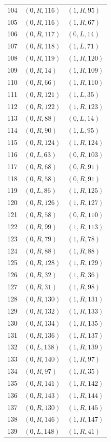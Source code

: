 \begin{longtable}{@{}rll@{}}
104 & $(0,R,116)$ & $(1,R,95)$\\
105 & $(0,R,116)$ & $(1,R,67)$\\
106 & $(0,R,117)$ & $(0,L,14)$\\
107 & $(0,R,118)$ & $(1,L,71)$\\
108 & $(0,R,119)$ & $(1,R,120)$\\
109 & $(0,R,14)$ & $(1,R,109)$\\
110 & $(0,R,66)$ & $(1,R,110)$\\
111 & $(0,R,121)$ & $(1,L,35)$\\
112 & $(0,R,122)$ & $(1,R,123)$\\
113 & $(0,R,88)$ & $(0,L,14)$\\
114 & $(0,R,90)$ & $(1,L,95)$\\
115 & $(0,R,124)$ & $(1,R,124)$\\
116 & $(0,L,63)$ & $(0,R,103)$\\
117 & $(0,R,68)$ & $(0,R,91)$\\
118 & $(0,R,58)$ & $(0,R,91)$\\
119 & $(0,L,86)$ & $(1,R,125)$\\
120 & $(0,R,126)$ & $(1,R,127)$\\
121 & $(0,R,58)$ & $(0,R,110)$\\
122 & $(0,R,99)$ & $(1,R,113)$\\
123 & $(0,R,79)$ & $(1,R,78)$\\
124 & $(0,R,88)$ & $(1,R,88)$\\
125 & $(0,R,128)$ & $(1,R,129)$\\
126 & $(0,R,32)$ & $(1,R,36)$\\
127 & $(0,R,31)$ & $(1,R,98)$\\
128 & $(0,R,130)$ & $(1,R,131)$\\
129 & $(0,R,132)$ & $(1,R,133)$\\
130 & $(0,R,134)$ & $(1,R,135)$\\
131 & $(0,R,136)$ & $(1,R,137)$\\
132 & $(0,L,138)$ & $(1,R,139)$\\
133 & $(0,R,140)$ & $(1,R,97)$\\
134 & $(0,R,97)$ & $(1,R,35)$\\
135 & $(0,R,141)$ & $(1,R,142)$\\
136 & $(0,R,143)$ & $(1,R,144)$\\
137 & $(0,R,130)$ & $(1,R,145)$\\
138 & $(0,R,146)$ & $(1,R,147)$\\
139 & $(0,L,148)$ & $(1,R,41)$\\

\end{longtable}
